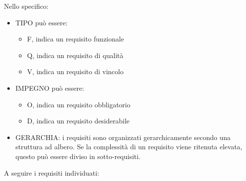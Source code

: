 Nello specifico:
\begin{itemize}
\item TIPO può essere:
	\begin{itemize}
		\item F, indica un requisito funzionale
		\item Q, indica un requisito di qualità
		\item V, indica un requisito di vincolo
	\end{itemize} 
\item IMPEGNO può essere:
	\begin{itemize}
		\item O, indica un requisito obbligatorio
		\item D, indica un requisito desiderabile
	\end{itemize} 
\item GERARCHIA: i requisiti sono organizzati gerarchicamente secondo una struttura ad albero. Se la complessità di un requisito viene ritenuta elevata, questo può essere diviso in sotto-requisiti.
\end{itemize}

A seguire i requisiti individuati:

